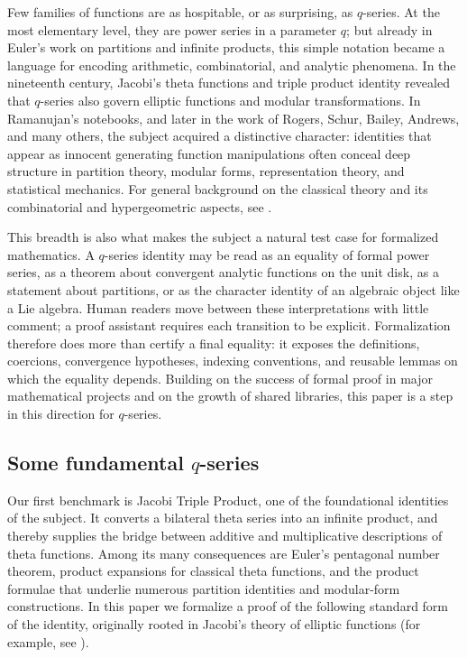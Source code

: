 \documentclass[12pt]{amsart}
\theoremstyle{definition}
\theoremstyle{remark}
\numberwithin{equation}{subsection}
\begin{document}
Few families of functions are as hospitable, or as surprising, as $q$-series.  At the most elementary level, they are power series in a parameter $q$; but already in Euler's work on partitions and infinite products, this simple notation became a language for encoding arithmetic, combinatorial, and analytic phenomena.  In the nineteenth century, Jacobi's theta functions and triple product identity revealed that $q$-series also govern elliptic functions and modular transformations.  In Ramanujan's notebooks, and later in the work of Rogers, Schur, Bailey, Andrews, and many others, the subject acquired a distinctive character: identities that appear as innocent generating function manipulations often conceal deep structure in partition theory, modular forms, representation theory, and statistical mechanics.  For general background on the classical theory and its combinatorial and hypergeometric aspects, see \cite{AndrewsBook,GasperRahman,SillsBook}.

This breadth is also what makes the subject a natural test case for formalized mathematics.  A $q$-series identity may be read as an equality of formal power series, as a theorem about convergent analytic functions on the unit disk, as a statement about partitions, or as the character identity of an algebraic object like a Lie algebra.  Human readers move between these interpretations with little comment; a proof assistant requires each transition to be explicit.  Formalization therefore does more than certify a final equality: it exposes the definitions, coercions, convergence hypotheses, indexing conventions, and reusable lemmas on which the equality depends.  Building on the success of formal proof in major mathematical projects and on the growth of shared libraries, this paper is a step in this direction for $q$-series.

\subsection{Some fundamental $q$-series}



Our first benchmark is Jacobi Triple Product, one of the foundational identities of the subject.  It converts a bilateral theta series into an infinite product, and thereby supplies the bridge between additive and multiplicative descriptions of theta functions.  Among its many consequences are Euler's pentagonal number theorem, product expansions for classical theta functions, and the product formulae that underlie numerous partition identities and modular-form constructions.  In this paper we formalize a proof of the following standard form of the identity, originally rooted in Jacobi's theory of elliptic functions (for example, see \cite{Andrews1974, Andrews1975, Andrews1986, AndrewsBook, Jacobi1829}).
\end{document}
